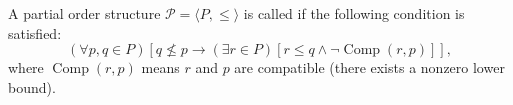 A partial order structure $\mathcal{P} = \langle P, \leq \rangle$ is called  if the following condition is satisfied:
$$(\forall p, q \in P)[q \not\leq p \rightarrow (\exists r \in P)[r \leq q \land \neg \operatorname{Comp}(r, p)]],$$
where $\operatorname{Comp}(r, p)$ means $r$ and $p$ are compatible (there exists a nonzero lower bound).
